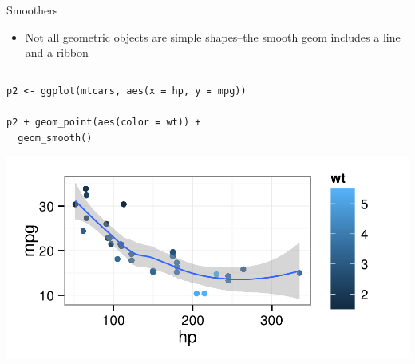 \documentclass[table,smaller]{beamer}
\begin{document}
\begin{frame}[fragile,label=sec-2-5]{Smoothers}
 \begin{itemize}
\item Not all geometric objects are simple shapes--the smooth geom includes a line and a ribbon
\end{itemize}

\begin{columns}  \begin{block}{}

\begin{verbatim}
p2 <- ggplot(mtcars, aes(x = hp, y = mpg))

p2 + geom_point(aes(color = wt)) +
  geom_smooth()
\end{verbatim}

\includegraphics[width=.9\linewidth]{images/mtcarsLayers2.png}
\end{block} \end{columns}
\end{frame}
\end{document}
